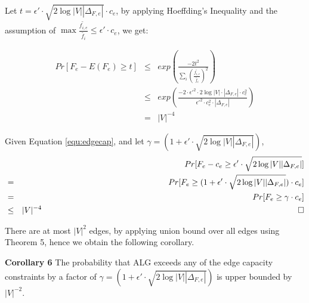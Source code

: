 \documentclass[conference]{IEEEtran}
\newcommand*{\QEDB}{\hfill\ensuremath{\square}}%
\begin{document}
Let $t=\epsilon' \cdot \sqrt{2\log|V||\Delta_{F,e}|} \cdot c_e$, by applying Hoeffding's Inequality and the assumption of $\max \frac{\tilde{f_{i,e}}}{\tilde{f_i}} \le \epsilon' \cdot c_e$, we get:

\begin{eqnarray}
Pr[F_e - E(F_e) \ge t] &\le& exp(\frac{-2t^2}{\sum_{i}(\frac{\tilde{f_{i,e}}}{\tilde{f_i}})^2}) \\ \nonumber
&\le& exp(\frac{-2 \cdot \epsilon'^2 \cdot 2\log|V| \cdot |\Delta_{F,e}| \cdot c_e^2}{\epsilon'^2 \cdot c_e^2 \cdot |\Delta_{F,e}|}) \\ \nonumber
&=& |V|^{-4}
\end{eqnarray}


Given Equation \ref{equ:edgecap}, and let $\gamma = (1+\epsilon' \cdot \sqrt{2\log|V||\Delta_{F,e}|})$,
\begin{eqnarray} \nonumber
&&Pr[F_e - c_e \ge \epsilon' \cdot \sqrt{2\log|V||\Delta_{F,e}|}] \\ \nonumber
&=& Pr[F_e \ge (1+\epsilon' \cdot \sqrt{2\log|V||\Delta_{F,e}|}) \cdot c_e] \\ \nonumber
&=& Pr[F_e \ge \gamma \cdot c_e] \\ \nonumber
&\le& |V|^{-4} \,\,\,\,\,\,\,\,\,\,\,\,\,\,\,\,\,\,\,\,\,\,\,\,\,\,\,\,\,\,\,\,\,\,\,\,\,\,\,\,\,\,\,\,\,\,\,\,\,\,\,\,\,\,\,\,\,\,\,\,\,\,\,\,\,\,\,\,\,\,\,\,\,\,\,\,\,\,\,\,\,\,\,\,\,\,\,\,\,\,\,\,\,\,\,\,\,\,\,\,\,\,\,\,\,\,\,\,\,\,\,\,\,\,\,\,\,\,\,\,\,\,\,\,\,\,\,\,\,\,\,\,\,\,\,\,\,\,\,\,\,\,\,\,\,\,\,\,\,\,\,\,\,\,\,\,\,\,\,\,\,\,\,\,\,\,\,\,\,\,\,\,\,\,\,\,\,\,\,\,\,\,\,\,\,\,\,\,\,\, \QEDB
\end{eqnarray}

%

There are at most $|V|^2$ edges, by applying union bound over all edges using Theorem 5, hence we obtain the following corollary.

\textbf{Corollary 6} The probability that ALG exceeds any of the edge capacity constraints by a factor of $\gamma = (1+\epsilon' \cdot \sqrt{2\log|V||\Delta_{F,e}|})$ is upper bounded by $|V|^{-2}$.
\end{document}
